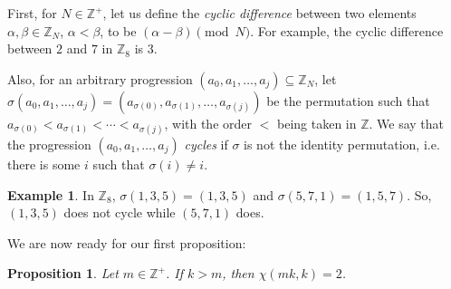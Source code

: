 \documentclass{article}
\newtheorem{proposition}[theorem]{Proposition}
\theoremstyle{definition}
\newtheorem*{example}{Example}
\theoremstyle{remark}
\begin{document}
First, for $N \in \mathbb{Z}^+$, let us define the \textit{cyclic difference} between two elements $\alpha,\beta \in \mathbb{Z}_{N}$, $\alpha < \beta$, to be $(\alpha-\beta) \pmod N$. For example, the cyclic difference between $2$ and $7$ in $\mathbb{Z}_8$ is $3$.

Also, for an arbitrary progression $(a_0,a_1,\ldots,a_j) \subseteq \mathbb{Z}_N$, let $\sigma(a_0,a_1,\ldots,a_j) = (a_{\sigma(0)},a_{\sigma(1)},\ldots,a_{\sigma(j)})$ be the permutation such that $a_{\sigma(0)} < a_{\sigma(1)} < \cdots < a_{\sigma(j)}$, with the order $<$ being taken in $\mathbb{Z}$. We say that the progression $(a_0,a_1,\ldots,a_j)$ \textit{cycles} if $\sigma$ is not the identity permutation, i.e. there is some $i$ such that $\sigma(i) \neq i$.

\begin{example}
    In $\mathbb{Z}_{8}$, $\sigma(1,3,5) = (1,3,5)$ and $\sigma(5,7,1) = (1,5,7)$. So, $(1,3,5)$ does not cycle while $(5,7,1)$ does.
\end{example}

We are now ready for our first proposition:

\begin{proposition}\label{prop:4.1new}
    Let $m \in \mathbb{Z}^+$. If $k > m$, then $\chi(mk,k) = 2$.
\end{proposition}
\end{document}
